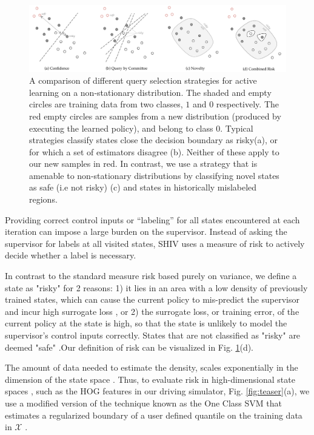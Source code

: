 \documentclass[10pt, conference]{ieeeconf}      %
\newcommand{\fpnote}[1]{\ifthenelse{ \boolean{include-notes}}%
 {\textcolor{blue}{\textbf{FP: #1}}}{}}
\begin{document}
\begin{figure}[t]
\centering

\includegraphics[width=\textwidth]{figures/active_learning.pdf}

\caption{A comparison of different query selection strategies for active learning on a non-stationary distribution. The shaded and empty circles are training data from two classes, $1$ and $0$ respectively. The red empty circles are samples from a new distribution (produced by executing the learned policy), and belong to class $0$. Typical strategies classify states close the decision boundary as risky(a), or for which a set of estimators disagree (b). Neither of these apply to our new samples in red. In contrast, we use a strategy that is amenable to non-stationary distributions by classifying  novel states as safe (i.e not risky) (c) and states in historically mislabeled regions. }
\label{fig:support_example}
\end{figure}



Providing correct control inputs or ``labeling'' for all states encountered at each
iteration can impose a large burden on the supervisor.
Instead of asking the supervisor for labels at all visited states, SHIV uses a measure of risk to actively decide whether a label is necessary. 

In contrast to the standard measure risk based purely on variance, we define a state as "risky" for 2 reasons: 1) it lies in an area with a low density of
previously trained states, which can cause the current policy to mis-predict the supervisor and incur high surrogate
loss \cite{tokdar2010importance}, or 2) the surrogate loss, or training error, of the current policy at the state  is high, so that the state is unlikely to model the supervisor's control inputs correctly. States that are not classified as "risky" are deemed "safe" .Our definition of risk can be visualized in Fig. \ref{fig:support_example}(d).  

The amount of data needed to estimate the density, scales exponentially in the dimension of the state space \cite{nadaraya1964estimating}. 
Thus, to evaluate risk in high-dimensional state spaces , such as the HOG features in our driving simulator, Fig. \ref{fig:teaser}(a), we use
a modified version of the technique known as the One Class SVM that  estimates a regularized boundary of a user defined quantile on the training data in $\mathcal{X}$ \cite{scholkopf2001estimating}.
\end{document}
